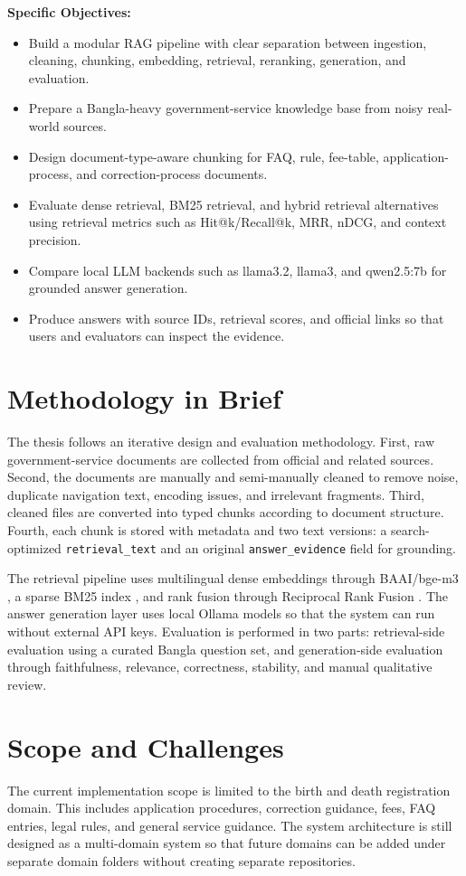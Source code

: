 \documentclass[12pt,oneside,openany]{report}
\begin{document}
\textbf{Specific Objectives:}
\begin{itemize}
    \item Build a modular RAG pipeline with clear separation between ingestion, cleaning, chunking, embedding, retrieval, reranking, generation, and evaluation.
    \item Prepare a Bangla-heavy government-service knowledge base from noisy real-world sources.
    \item Design document-type-aware chunking for FAQ, rule, fee-table, application-process, and correction-process documents.
    \item Evaluate dense retrieval, BM25 retrieval, and hybrid retrieval alternatives using retrieval metrics such as Hit@k/Recall@k, MRR, nDCG, and context precision.
    \item Compare local LLM backends such as llama3.2, llama3, and qwen2.5:7b for grounded answer generation.
    \item Produce answers with source IDs, retrieval scores, and official links so that users and evaluators can inspect the evidence.
\end{itemize}

\section{Methodology in Brief}
The thesis follows an iterative design and evaluation methodology. First, raw government-service documents are collected from official and related sources. Second, the documents are manually and semi-manually cleaned to remove noise, duplicate navigation text, encoding issues, and irrelevant fragments. Third, cleaned files are converted into typed chunks according to document structure. Fourth, each chunk is stored with metadata and two text versions: a search-optimized \texttt{retrieval\_text} and an original \texttt{answer\_evidence} field for grounding.

The retrieval pipeline uses multilingual dense embeddings through BAAI/bge-m3 \cite{chen2024bgem3}, a sparse BM25 index \cite{robertson2009bm25}, and rank fusion through Reciprocal Rank Fusion \cite{cormack2009rrf}. The answer generation layer uses local Ollama models so that the system can run without external API keys. Evaluation is performed in two parts: retrieval-side evaluation using a curated Bangla question set, and generation-side evaluation through faithfulness, relevance, correctness, stability, and manual qualitative review.

\section{Scope and Challenges}
The current implementation scope is limited to the birth and death registration domain. This includes application procedures, correction guidance, fees, FAQ entries, legal rules, and general service guidance. The system architecture is still designed as a multi-domain system so that future domains can be added under separate domain folders without creating separate repositories.
\end{document}
